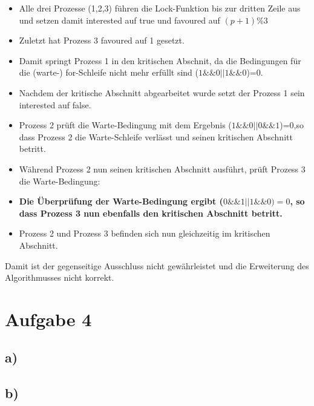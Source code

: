 \documentclass[11pt,a4paper,DIV=10,]{scrartcl}
\begin{document}
\begin{itemize}
 \item Alle drei Prozesse (1,2,3) führen die Lock-Funktion bis zur dritten Zeile aus und setzen damit interested auf true und favoured auf $(p+1)\%3$ 
 \item Zuletzt hat Prozess 3 favoured auf 1 gesetzt. 
 \item Damit springt Prozess 1 in den kritischen Abschnit, da die Bedingungen für die (warte-) for-Schleife nicht mehr erfüllt sind ($1 \&\& 0 || 1  \&\& 0$)=0.
 \item Nachdem der kritische Abschnitt abgearbeitet wurde setzt der Prozess 1 sein interested auf false. 
 \item Prozess 2 prüft die Warte-Bedingung mit dem Ergebnis ($1 \&\& 0 || 0 \&\& 1$)=0,so dass Prozess 2 die Warte-Schleife verlässt und seinen kritischen Abschnitt betritt. 
 \item Während Prozess 2 nun seinen kritischen Abschnitt ausführt, prüft Prozess 3 die Warte-Bedingung:
 \item \textbf{Die Überprüfung der Warte-Bedingung ergibt ($0 \&\& 1 || 1 \&\& 0)=0$, so dass Prozess 3 nun ebenfalls den kritischen Abschnitt betritt.}
 \item Prozess 2 und Prozess 3 befinden sich nun gleichzeitig im kritischen Abschnitt. 
 \end{itemize}

Damit ist der gegenseitige Ausschluss nicht gewährleistet und die Erweiterung des Algorithmusses nicht korrekt. 

\section*{Aufgabe 4}
\subsection*{a)}
\subsection*{b)}
\end{document}
